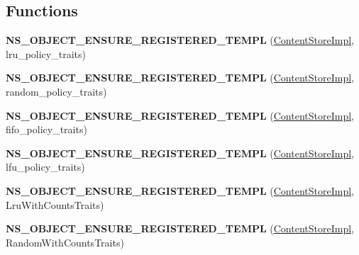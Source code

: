 \subsection*{Functions}
\begin{DoxyCompactItemize}
\item 
{\bfseries N\+S\+\_\+\+O\+B\+J\+E\+C\+T\+\_\+\+E\+N\+S\+U\+R\+E\+\_\+\+R\+E\+G\+I\+S\+T\+E\+R\+E\+D\+\_\+\+T\+E\+M\+PL} (\hyperlink{classns3_1_1ndn_1_1cs_1_1ContentStoreImpl}{Content\+Store\+Impl}, lru\+\_\+policy\+\_\+traits)\hypertarget{namespacens3_1_1ndn_1_1cs_a4340446259535dc9825047ad096cf40a}{}\label{namespacens3_1_1ndn_1_1cs_a4340446259535dc9825047ad096cf40a}

\item 
{\bfseries N\+S\+\_\+\+O\+B\+J\+E\+C\+T\+\_\+\+E\+N\+S\+U\+R\+E\+\_\+\+R\+E\+G\+I\+S\+T\+E\+R\+E\+D\+\_\+\+T\+E\+M\+PL} (\hyperlink{classns3_1_1ndn_1_1cs_1_1ContentStoreImpl}{Content\+Store\+Impl}, random\+\_\+policy\+\_\+traits)\hypertarget{namespacens3_1_1ndn_1_1cs_a9b86b665af9362bcb5f181d79270936e}{}\label{namespacens3_1_1ndn_1_1cs_a9b86b665af9362bcb5f181d79270936e}

\item 
{\bfseries N\+S\+\_\+\+O\+B\+J\+E\+C\+T\+\_\+\+E\+N\+S\+U\+R\+E\+\_\+\+R\+E\+G\+I\+S\+T\+E\+R\+E\+D\+\_\+\+T\+E\+M\+PL} (\hyperlink{classns3_1_1ndn_1_1cs_1_1ContentStoreImpl}{Content\+Store\+Impl}, fifo\+\_\+policy\+\_\+traits)\hypertarget{namespacens3_1_1ndn_1_1cs_af1a2b3a44a60a4e1750c7f43c7d01509}{}\label{namespacens3_1_1ndn_1_1cs_af1a2b3a44a60a4e1750c7f43c7d01509}

\item 
{\bfseries N\+S\+\_\+\+O\+B\+J\+E\+C\+T\+\_\+\+E\+N\+S\+U\+R\+E\+\_\+\+R\+E\+G\+I\+S\+T\+E\+R\+E\+D\+\_\+\+T\+E\+M\+PL} (\hyperlink{classns3_1_1ndn_1_1cs_1_1ContentStoreImpl}{Content\+Store\+Impl}, lfu\+\_\+policy\+\_\+traits)\hypertarget{namespacens3_1_1ndn_1_1cs_a26660c0cfd8e5d68514f90191c98c934}{}\label{namespacens3_1_1ndn_1_1cs_a26660c0cfd8e5d68514f90191c98c934}

\item 
{\bfseries N\+S\+\_\+\+O\+B\+J\+E\+C\+T\+\_\+\+E\+N\+S\+U\+R\+E\+\_\+\+R\+E\+G\+I\+S\+T\+E\+R\+E\+D\+\_\+\+T\+E\+M\+PL} (\hyperlink{classns3_1_1ndn_1_1cs_1_1ContentStoreImpl}{Content\+Store\+Impl}, Lru\+With\+Counts\+Traits)\hypertarget{namespacens3_1_1ndn_1_1cs_aa8b5d66374edfe60e7114352d4c2ae1b}{}\label{namespacens3_1_1ndn_1_1cs_aa8b5d66374edfe60e7114352d4c2ae1b}

\item 
{\bfseries N\+S\+\_\+\+O\+B\+J\+E\+C\+T\+\_\+\+E\+N\+S\+U\+R\+E\+\_\+\+R\+E\+G\+I\+S\+T\+E\+R\+E\+D\+\_\+\+T\+E\+M\+PL} (\hyperlink{classns3_1_1ndn_1_1cs_1_1ContentStoreImpl}{Content\+Store\+Impl}, Random\+With\+Counts\+Traits)\hypertarget{namespacens3_1_1ndn_1_1cs_a5788e19e6067d1473bedfe964910ba03}{}\label{namespacens3_1_1ndn_1_1cs_a5788e19e6067d1473bedfe964910ba03}


\end{DoxyCompactItemize}
